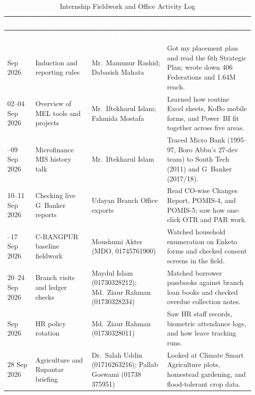 \documentclass[12pt,a4paper]{report}
\newcommand{\headercell}[1]{\textcolor{white}{\textbf{#1}}}
\begin{document}
{\small
\begin{longtable}{|>{\raggedright\arraybackslash}p{1.8cm}|>{\raggedright\arraybackslash}p{3.8cm}|>{\raggedright\arraybackslash}p{3.6cm}|>{\raggedright\arraybackslash}p{5.0cm}|}
\caption{Internship Fieldwork and Office Activity Log}\label{tab:log}\\
\hline
\rowcolor{RDRSBlue}\headercell{Date} & \headercell{Activity} & \headercell{Who I worked with} & \headercell{Notes and takeaways} \\ \hline
\endfirsthead
\hline
\rowcolor{RDRSBlue}\headercell{Date} & \headercell{Activity} & \headercell{Who I worked with} & \headercell{Notes and takeaways} \\ \hline
\endhead
\hline
\endfoot
\hline
\endlastfoot
01 Sep 2026 & Induction and reporting rules & Mr.~Mamunur Rashid; Dabasish Mahata & Got my placement plan and read the 6th Strategic Plan; wrote down 406 Federations and 1.64M reach. \\ \hline
\rowcolor{RDRSLight} 02--04 Sep 2026 & Overview of MEL tools and projects & Mr.~Iftekharul Islam; Fahmida Mostafa & Learned how routine Excel sheets, KoBo mobile forms, and Power~BI fit together across five areas. \\ \hline
07--09 Sep 2026 & Microfinance MIS history talk & Mr.~Iftekharul Islam & Traced Micro Bank (1995--97, Boro Abbu's 27-dev team) to South Tech (2011) and G~Banker (2017/18). \\ \hline
\rowcolor{RDRSLight} 10--11 Sep 2026 & Checking live G~Banker reports & Udayan Branch Office exports & Read CO-wise Changes Report, POMIS-4, and POMIS-5; saw how one-click OTR and PAR work. \\ \hline
13--17 Sep 2026 & C-RANGPUR baseline fieldwork & Moushumi Akter (MDO, 01745761900) & Watched household enumeration on Enketo forms and checked consent screens in the field. \\ \hline
\rowcolor{RDRSLight} 20--24 Sep 2026 & Branch visits and ledger checks & Maydul Islam (01730328212); Md.~Ziaur Rahman (01730328234) & Matched borrower passbooks against branch loan books and checked overdue collection notes. \\ \hline
27 Sep 2026 & HR policy rotation & Md.~Ziaur Rahman (01730328011) & Saw HR staff records, biometric attendance logs, and how leave tracking runs. \\ \hline
\rowcolor{RDRSLight} 28 Sep 2026 & Agriculture and Rupantar briefing & Dr.~Salah Uddin (01716263216); Pallab Goswami (01738 375951) & Looked at Climate Smart Agriculture plots, homestead gardening, and flood-tolerant crop data. \\ \hline

\end{longtable}}
\end{document}
